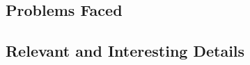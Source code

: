 \documentclass[onecolumn, draftclsnofoot,10pt, compsoc]{IEEEtran}
\begin{document}
\subsection{Problems Faced}
\subsection{Relevant and Interesting Details}

%
%
\end{document}
